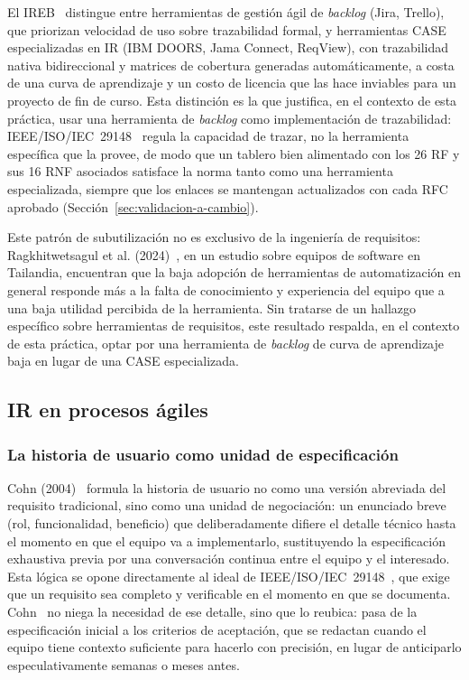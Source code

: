 \documentclass[journal,onecolumn]{IEEEtran}
\begin{document}
	El IREB~\cite{ireb_v31} distingue entre herramientas de gestión
	ágil de \emph{backlog} (Jira, Trello), que priorizan velocidad de
	uso sobre trazabilidad formal, y herramientas CASE especializadas
	en IR (IBM DOORS, Jama Connect, ReqView), con trazabilidad nativa
	bidireccional y matrices de cobertura generadas automáticamente, a
	costa de una curva de aprendizaje y un costo de licencia que las
	hace inviables para un proyecto de fin de curso. Esta distinción
	es la que justifica, en el contexto de esta práctica, usar una
	herramienta de \emph{backlog} como implementación de trazabilidad:
	IEEE/ISO/IEC~29148~\cite{ieee29148_2018} regula la capacidad de
	trazar, no la herramienta específica que la provee, de modo que un
	tablero bien alimentado con los 26 RF y sus 16 RNF asociados
	satisface la norma tanto como una herramienta especializada,
	siempre que los enlaces se mantengan actualizados con cada RFC
	aprobado (Sección~\ref{sec:validacion-a-cambio}).
	
	Este patrón de subutilización no es exclusivo de la ingeniería de
	requisitos: Ragkhitwetsagul et al.
	(2024)~\cite{ragkhitwetsagul2024}, en un estudio sobre equipos de
	software en Tailandia, encuentran que la baja adopción de
	herramientas de automatización en general responde más a la falta
	de conocimiento y experiencia del equipo que a una baja utilidad
	percibida de la herramienta. Sin tratarse de un hallazgo
	específico sobre herramientas de requisitos, este resultado
	respalda, en el contexto de esta práctica, optar por una
	herramienta de \emph{backlog} de curva de aprendizaje baja en
	lugar de una CASE especializada.
	
	\subsection{IR en procesos ágiles}
	\label{sec:agil-teoria}
	
	\subsubsection{La historia de usuario como unidad de especificación}
	
	Cohn (2004)~\cite{cohn2004} formula la historia de usuario no como
	una versión abreviada del requisito tradicional, sino como una
	unidad de negociación: un enunciado breve (rol, funcionalidad,
	beneficio) que deliberadamente difiere el detalle técnico hasta el
	momento en que el equipo va a implementarlo, sustituyendo la
	especificación exhaustiva previa por una conversación continua
	entre el equipo y el interesado. Esta lógica se opone directamente
	al ideal de IEEE/ISO/IEC~29148~\cite{ieee29148_2018}, que exige que
	un requisito sea completo y verificable en el momento en que se
	documenta. Cohn~\cite{cohn2004} no niega la necesidad de ese
	detalle, sino que lo reubica: pasa de la especificación inicial a
	los criterios de aceptación, que se redactan cuando el equipo
	tiene contexto suficiente para hacerlo con precisión, en lugar de
	anticiparlo especulativamente semanas o meses antes.
	
\end{document}
